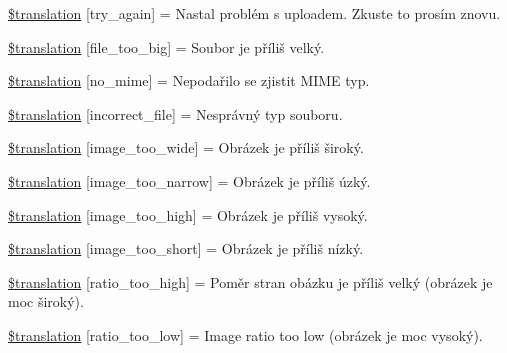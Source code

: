 \begin{DoxyCompactItemize}
\item 
\hyperlink{class_8upload_8cs___c_s_8php_a3afc377bd803683314f413a814243066}{\$translation} \mbox{[}\textquotesingle{}try\+\_\+again\textquotesingle{}\mbox{]} = \textquotesingle{}Nastal problém s uploadem. Zkuste to prosím znovu.\textquotesingle{}
\item 
\hyperlink{class_8upload_8cs___c_s_8php_a476278eb4a0c3df56af068e2d511a741}{\$translation} \mbox{[}\textquotesingle{}file\+\_\+too\+\_\+big\textquotesingle{}\mbox{]} = \textquotesingle{}Soubor je příliš velký.\textquotesingle{}
\item 
\hyperlink{class_8upload_8cs___c_s_8php_a191a55df8e3bb7f3c51b70f3c1932e02}{\$translation} \mbox{[}\textquotesingle{}no\+\_\+mime\textquotesingle{}\mbox{]} = \textquotesingle{}Nepodařilo se zjistit M\+I\+M\+E typ.\textquotesingle{}
\item 
\hyperlink{class_8upload_8cs___c_s_8php_a4d32343e2699edd6fd435f9c832cb9c7}{\$translation} \mbox{[}\textquotesingle{}incorrect\+\_\+file\textquotesingle{}\mbox{]} = \textquotesingle{}Nesprávný typ souboru.\textquotesingle{}
\item 
\hyperlink{class_8upload_8cs___c_s_8php_a0dd3e4930ca1f59ae280f4b1006525cd}{\$translation} \mbox{[}\textquotesingle{}image\+\_\+too\+\_\+wide\textquotesingle{}\mbox{]} = \textquotesingle{}Obrázek je příliš široký.\textquotesingle{}
\item 
\hyperlink{class_8upload_8cs___c_s_8php_a5c9a4cd67fd21c32e0a3b434591a6037}{\$translation} \mbox{[}\textquotesingle{}image\+\_\+too\+\_\+narrow\textquotesingle{}\mbox{]} = \textquotesingle{}Obrázek je příliš úzký.\textquotesingle{}
\item 
\hyperlink{class_8upload_8cs___c_s_8php_aa27bde361343f3b63c7cd441860024f8}{\$translation} \mbox{[}\textquotesingle{}image\+\_\+too\+\_\+high\textquotesingle{}\mbox{]} = \textquotesingle{}Obrázek je příliš vysoký.\textquotesingle{}
\item 
\hyperlink{class_8upload_8cs___c_s_8php_a86fcd4e1157b00032df451188d735527}{\$translation} \mbox{[}\textquotesingle{}image\+\_\+too\+\_\+short\textquotesingle{}\mbox{]} = \textquotesingle{}Obrázek je příliš nízký.\textquotesingle{}
\item 
\hyperlink{class_8upload_8cs___c_s_8php_a23396f6ce7f31e5e5f1b57580621d982}{\$translation} \mbox{[}\textquotesingle{}ratio\+\_\+too\+\_\+high\textquotesingle{}\mbox{]} = \textquotesingle{}Poměr stran obázku je příliš velký (obrázek je moc široký).\textquotesingle{}
\item 
\hyperlink{class_8upload_8cs___c_s_8php_ac533b9a479f056b0b8623e4268f068c2}{\$translation} \mbox{[}\textquotesingle{}ratio\+\_\+too\+\_\+low\textquotesingle{}\mbox{]} = \textquotesingle{}Image ratio too low (obrázek je moc vysoký).\textquotesingle{}

\end{DoxyCompactItemize}
